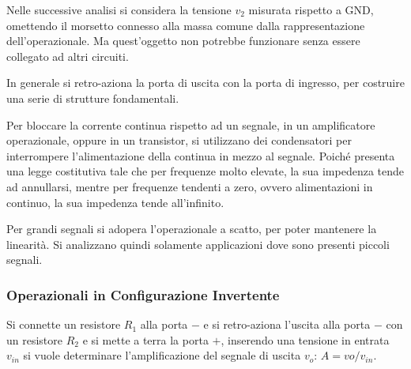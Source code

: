 \documentclass{article}
\numberwithin{equation}{subsection}
\begin{document}
Nelle successive analisi si considera la tensione $v_2$ misurata rispetto a GND, omettendo il morsetto connesso alla massa comune dalla rappresentazione 
dell'operazionale. Ma quest'oggetto non potrebbe funzionare senza essere collegato ad altri circuiti. 

In generale si retro-aziona la porta di uscita con la porta di ingresso, per costruire una serie di strutture fondamentali. 

Per bloccare la corrente continua rispetto ad un segnale, in un amplificatore operazionale, oppure in un transistor, si utilizzano dei condensatori per 
interrompere l'alimentazione della continua in mezzo al segnale. Poiché presenta una legge costitutiva tale che per frequenze molto elevate, la 
sua impedenza tende ad annullarsi, mentre per frequenze tendenti a zero, ovvero alimentazioni in continuo, la sua impedenza tende all'infinito. 

Per grandi segnali si adopera l'operazionale a scatto, per poter mantenere la linearità. Si analizzano quindi solamente applicazioni dove sono 
presenti piccoli segnali. 

\subsubsection{Operazionali in Configurazione Invertente}

Si connette un resistore $R_1$ alla porta $-$ e si retro-aziona l'uscita alla porta $-$ con un resistore $R_2$ e si mette a terra la porta $+$, 
inserendo una tensione in entrata $v_{in}$ si vuole determinare l'amplificazione del segnale di uscita $v_o$: $A=vo/v_{in}$. 
\end{document}
